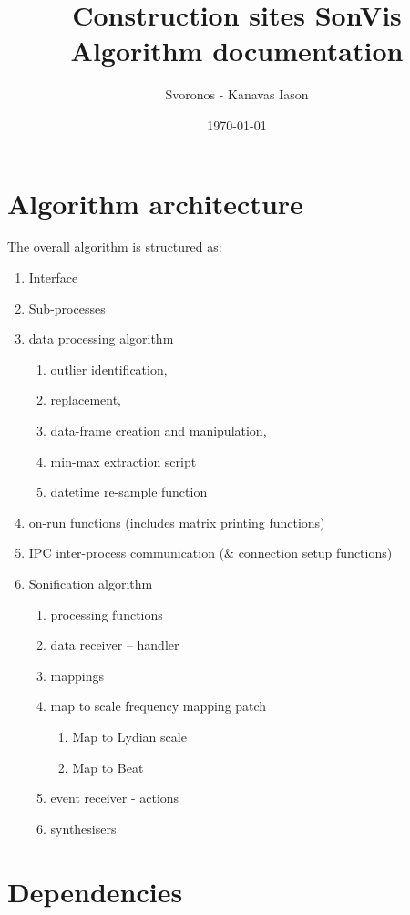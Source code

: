 \documentclass[11pt]{article}
\author{Svoronos - Kanavas Iason}
\date{\today}
\title{Construction sites SonVis Algorithm documentation}
\begin{document}
\maketitle
\tableofcontents


\section{Algorithm architecture}
\label{sec:org71acc51}
The overall algorithm is structured as:
\begin{enumerate}
\item Interface
\item Sub-processes
\item data processing algorithm
\begin{enumerate}
\item outlier identification,
\item replacement,
\item data-frame creation and manipulation,
\item min-max extraction script
\item datetime re-sample function
\end{enumerate}
\item on-run functions (includes matrix printing functions)
\item IPC inter-process communication (\& connection setup functions)
\item Sonification algorithm
\begin{enumerate}
\item processing functions
\item data receiver -- handler
\item mappings
\item map to scale frequency mapping patch
\begin{enumerate}
\item Map to Lydian scale
\item Map to Beat
\end{enumerate}
\item event receiver - actions
\item synthesisers
\end{enumerate}
\end{enumerate}



\section{Dependencies}
\label{sec:org6633c19}
\end{document}
